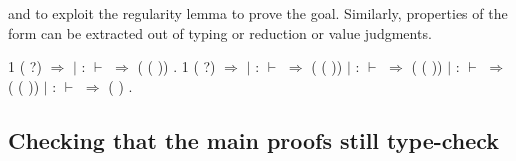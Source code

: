 \documentclass[12pt]{report}
\begin{document}
        and to exploit the regularity lemma 
    to prove the goal. Similarly, properties of the form  
    can be extracted out of typing or reduction or value judgments.
\begin{coqdoccode}
\coqdocemptyline
\coqdocnoindent
{} 1 ( ?) \ensuremath{\Rightarrow}\coqdoceol
\coqdocindent{1.00em}
  \coqdoceol
\coqdocindent{1.00em}
\ensuremath{|} :   \coqdocvar{\_} \coqdocvar{\_} \ensuremath{\vdash} \coqdocvar{\_} \ensuremath{\Rightarrow}  ( ( ))\coqdoceol
\coqdocindent{1.00em}
.\coqdoceol
\coqdocemptyline
\coqdocnoindent
{} 1 ( ?) \ensuremath{\Rightarrow}\coqdoceol
\coqdocindent{1.00em}
  \coqdoceol
\coqdocindent{1.00em}
\ensuremath{|} :  \coqdocvar{\_}  \coqdocvar{\_} \ensuremath{\vdash} \coqdocvar{\_} \ensuremath{\Rightarrow}  ( ( ))\coqdoceol
\coqdocindent{1.00em}
\ensuremath{|} :   \coqdocvar{\_} \ensuremath{\vdash} \coqdocvar{\_} \ensuremath{\Rightarrow}  ( ( ))\coqdoceol
\coqdocindent{1.00em}
\ensuremath{|} :  \coqdocvar{\_}  \ensuremath{\vdash} \coqdocvar{\_} \ensuremath{\Rightarrow}  ( ( ))\coqdoceol
\coqdocindent{1.00em}
\ensuremath{|} :   \ensuremath{\vdash} \coqdocvar{\_} \ensuremath{\Rightarrow}  ( )\coqdoceol
\coqdocindent{1.00em}
.\coqdoceol
\coqdocemptyline
\end{coqdoccode}
\subsection{Checking that the main proofs still type-check}
\end{document}

